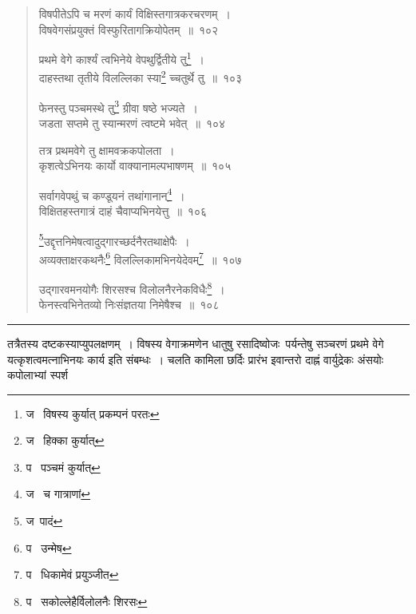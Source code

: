 \documentclass[11pt, openany]{book}
\begin{document}
\begin{quote}
{\na विषपीतेऽपि च मरणं कार्यं विक्षिस्तगात्रकरचरणम्~।\\
विषवेगसंप्रयुक्तं विस्फुरितागक्रियोपेतम्~॥~१०२

प्रथमे वेगे कार्श्यं त्वभिनेये वेपथुर्द्वितीये तु\renewcommand{\thefootnote}{1}\footnote{ज \textendash\  विषस्य कुर्यात् प्रकम्पनं परतः}~।\\
दाहस्तथा तृतीये विलल्लिका स्या\renewcommand{\thefootnote}{2}\footnote{ज \textendash\  हिक्का कुर्यात्} च्चतुर्थे तु~॥~१०३

फेनस्तु पञ्चमस्थे तु\renewcommand{\thefootnote}{3}\footnote{प \textendash\  पञ्चमं कुर्यात्} ग्रीवा षष्ठे भज्यते~।\\
जडता सप्तमे तु स्यान्मरणं त्वष्टमे भवेत्~॥~१०४

तत्र प्रथमवेगे तु क्षामवक्रकपोलता~।\\
कृशत्वेऽभिनयः कार्यो वाक्यानामल्पभाषणम्~॥~१०५

सर्वागवेपथुं च कण्डूयनं तथांगानान्\renewcommand{\thefootnote}{4}\footnote{ज \textendash\  च गात्राणां}~।\\
विक्षितहस्तगात्रं दाहं चैवाप्यभिनयेत्तु~॥~१०६

\renewcommand{\thefootnote}{5}\footnote{ज\textendash\  पादं}उद्दृत्तनिमेषत्वादुद्गारच्छर्दनैरतथाक्षेपैः~।\\
अव्यक्ताक्षरकथनैः\renewcommand{\thefootnote}{6}\footnote{प \textendash\  उन्मेष} विलल्लिकामभिनयेदेवम्\renewcommand{\thefootnote}{7}\footnote{प \textendash\  धिकामेवं प्रयुञ्जीत}~॥~१०७

उद्गारवमनयोगैः शिरसश्च विलोलनैरनेकविधैः\renewcommand{\thefootnote}{8}\footnote{प \textendash\  सकोल्लेहैर्विलोलनैः शिरसः}~।\\
फेनस्त्वभिनेतव्यो निःसंज्ञतया निमेषैश्च~॥~१०८}
\end{quote}

\hrule

\vspace{2mm}
\noindent
तत्रैतस्य दष्टकस्याप्युपलक्षणम्~। विषस्य वेगाक्रमणेन धातुषु रसादिष्वोजः\textendash\ पर्यन्तेषु सञ्चरणं प्रथमे वेगे यत्कृशत्वमत्नाभिनयः कार्य इति संबम्धः~। चलति कामिला छर्दिः प्रारंभ इवान्तरो दाह्नं वार्युद्रेकः अंसयोः कपोलाभ्यां स्पर्श\textendash

\newpage
\end{document}
